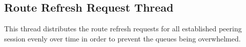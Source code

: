 \subsection{Route Refresh Request Thread}
This thread distributes the route refresh requests for all established peering session evenly over time in order to prevent the queues being overwhelmed.  

